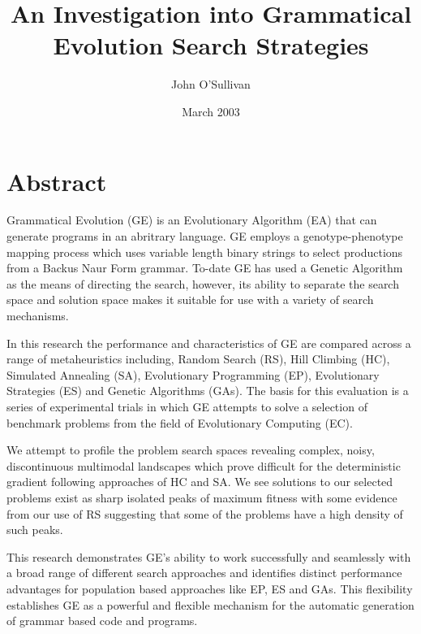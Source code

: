 \documentclass[12pt,oneside,a4paper]{article}
\author{John O'Sullivan}
\date{March 2003}
\title{An Investigation into Grammatical Evolution Search Strategies}
\begin{document}
\maketitle
\thispagestyle{empty}
\section*{Abstract}
Grammatical Evolution (GE) is an Evolutionary Algorithm (EA) that can generate programs in an abritrary language. GE employs a genotype-phenotype mapping process which uses variable length binary strings to select productions from a Backus Naur Form grammar. To-date GE has used a Genetic Algorithm as the means of directing the search, however, its ability to separate the search space and solution space makes it suitable for use with a variety of search mechanisms.

In this research the performance and characteristics of GE are compared across a range of metaheuristics including, Random Search (RS), Hill Climbing (HC), Simulated Annealing (SA), Evolutionary Programming (EP), Evolutionary Strategies (ES) and Genetic Algorithms (GAs). The basis for this evaluation is a series of experimental trials in which GE attempts to solve a selection of benchmark problems from the field of Evolutionary Computing (EC).

We attempt to profile the problem search spaces revealing complex, noisy, discontinuous multimodal landscapes which prove difficult for the deterministic gradient following approaches of HC and SA. We see solutions to our selected problems exist as sharp isolated peaks of maximum fitness with some evidence from our use of RS suggesting that some of the problems have a high density of such peaks.

This research demonstrates GE's ability to work successfully and seamlessly with a broad range of different search approaches and identifies  distinct performance advantages for population based approaches like EP, ES and GAs. This flexibility establishes GE as a powerful and flexible mechanism for the automatic generation of grammar based code and programs. 
\end{document}

